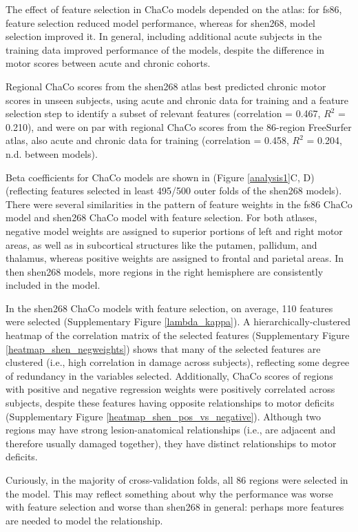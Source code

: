 \documentclass[10pt]{article}
\begin{document}
The effect of feature selection in ChaCo models depended on the atlas: for fs86, feature selection reduced model performance, whereas for shen268, model selection improved it. In general, including additional acute subjects in the training data improved performance of the models, despite the difference in motor scores between acute and chronic cohorts. 

Regional ChaCo scores from the shen268 atlas best predicted chronic motor scores in unseen subjects, using acute and chronic data for training and a feature selection step to identify a subset of relevant features (correlation = 0.467, $R^2$ = 0.210), and were on par with regional ChaCo scores from the 86-region FreeSurfer atlas, also acute and chronic data for training (correlation = 0.458, $R^2$ = 0.204, n.d. between models). 

Beta coefficients for ChaCo models are shown in (Figure \ref{analysis1}C, D) (reflecting features selected in least 495/500 outer folds of the shen268 models). There were several similarities in the pattern of feature weights in the fs86 ChaCo model and shen268 ChaCo model with feature selection. For both atlases, negative model weights are assigned to superior portions of left and right motor areas, as well as in subcortical structures like the putamen, pallidum, and thalamus, whereas positive weights are assigned to frontal and parietal areas. In then shen268 models, more regions in the right hemisphere are consistently included in the model.

In the shen268 ChaCo models with feature selection, on average, 110 features were selected (Supplementary Figure \ref{lambda_kappa}). A hierarchically-clustered heatmap of the correlation matrix of the selected features (Supplementary Figure \ref{heatmap_shen_negweights}) shows that many of the selected features are clustered (i.e., high correlation in damage across subjects), reflecting some degree of redundancy in the variables selected. Additionally, ChaCo scores of regions with positive and negative regression weights were positively correlated across subjects, despite these features having opposite relationships to motor deficits (Supplementary Figure \ref{heatmap_shen_pos_vs_negative}). Although two regions may have strong lesion-anatomical relationships (i.e., are adjacent and therefore usually damaged together), they have distinct relationships to motor deficits. 

Curiously, in the majority of cross-validation folds, all 86 regions were selected in the model. This may reflect something about why the performance was worse with feature selection and worse than shen268 in general: perhaps more features are needed to model the relationship.
\end{document}
